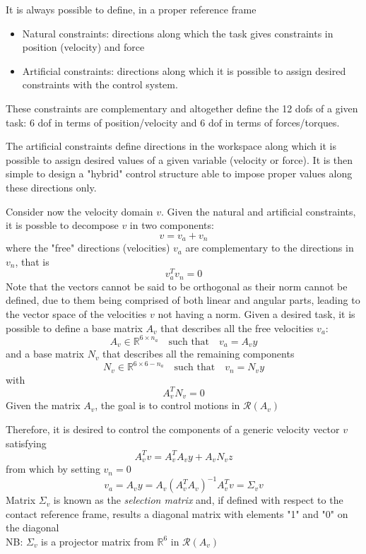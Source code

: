 \documentclass{book}
\begin{document}
It is always possible to define, in a proper reference frame 
\begin{itemize}
    \item Natural constraints: directions along which the task gives constraints in position (velocity) and force 
    \item Artificial constraints: directions along which it is possible to assign desired constraints with the control system. 
\end{itemize}
These constraints are complementary and altogether define the 12 dofs of a given task: 6 dof in terms of position/velocity and 6 dof in terms of forces/torques. 

The artificial constraints define directions in the workspace along which it is possible to assign desired values of a given variable (velocity or force). It is then simple to design a "hybrid" control structure able to impose proper values along these directions only. 

Consider now the velocity domain $v$. Given the natural and artificial constraints, it is possble to decompose $v$ in two components:
\[
    v=v_a+v_n
\]
where the "free" directions (velocities) $v_a$ are complementary to the directions in $v_n$, that is 
\[
    v_a^Tv_n=0
\]
Note that the vectors cannot be said to be orthogonal as their norm cannot be defined, due to them being comprised of both linear and angular parts, leading to the vector space of the velocities $v$ not having a norm. Given a desired task, it is possible to define a base matrix $A_v$ that describes all the free velocities $v_a$:
\[
    A_v\in\mathbb{R}^{6\times n_a} \quad \text{such that} \quad v_a=A_vy 
\]
and a base matrix $N_v$ that describes all the remaining components 
\[
    N_v\in\mathbb{R}^{6\times 6-n_a} \quad \text{such that} \quad v_n=N_vy 
\]
with
\[
    A_v^TN_v=0    
\]
Given the matrix $A_v$, the goal is to control motions in $\mathcal{R}(A_v)$

Therefore, it is desired to control the components of a generic velocity vector $v$ satisfying 
\[
    A_v^Tv=A_v^TA_vy+A_vN_vz
\]
from which by setting $v_n=0$  
\[
    v_a = A_vy=A_v(A_v^TA_v)^{-1}A_v^Tv=\Sigma_vv
\]
Matrix $\Sigma_v$ is known as the \emph{selection matrix} and, if defined with respect to the contact reference frame, results a diagonal matrix with elements "1" and "0" on the diagonal\\
NB: $\Sigma_v$ is a projector matrix from $\mathbb{R}^6$ in $\mathcal{R}(A_v)$
\end{document}
